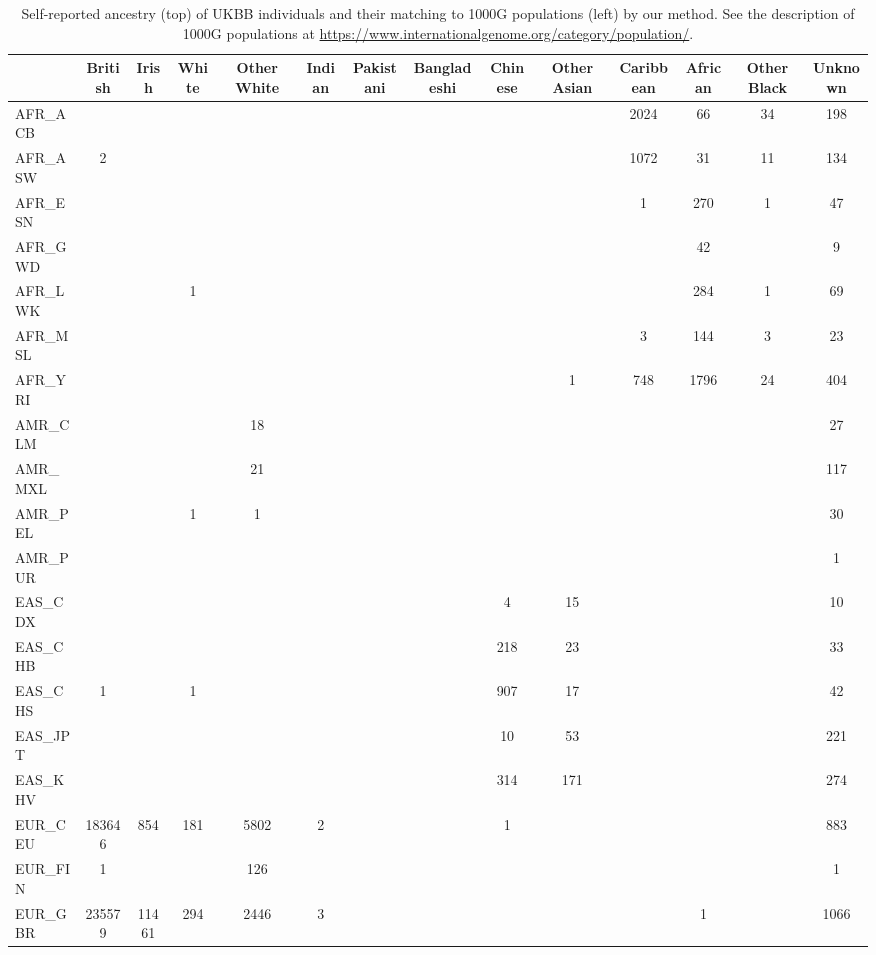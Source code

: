 \begin{table}[ht]
\centering
\caption{Self-reported ancestry (top) of UKBB individuals and their matching to 1000G populations (left) by our method. See the description of 1000G populations at \url{https://www.internationalgenome.org/category/population/}.} 
\label{tab:ancestry-fine-pred}
\begin{tabular}{|l|c|c|c|c|c|c|c|c|c|c|c|c|c|}
  \hline
 & British & Irish & White & Other White & Indian & Pakistani & Bangladeshi & Chinese & Other Asian & Caribbean & African & Other Black & Unknown \\ 
  \hline
AFR\_ACB &  &  &  &  &  &  &  &  &  & 2024 & 66 & 34 & 198 \\ 
  AFR\_ASW & 2 &  &  &  &  &  &  &  &  & 1072 & 31 & 11 & 134 \\ 
  AFR\_ESN &  &  &  &  &  &  &  &  &  & 1 & 270 & 1 & 47 \\ 
  AFR\_GWD &  &  &  &  &  &  &  &  &  &  & 42 &  & 9 \\ 
  AFR\_LWK &  &  & 1 &  &  &  &  &  &  &  & 284 & 1 & 69 \\ 
  AFR\_MSL &  &  &  &  &  &  &  &  &  & 3 & 144 & 3 & 23 \\ 
  AFR\_YRI &  &  &  &  &  &  &  &  & 1 & 748 & 1796 & 24 & 404 \\ 
   \hline
AMR\_CLM &  &  &  & 18 &  &  &  &  &  &  &  &  & 27 \\ 
  AMR\_MXL &  &  &  & 21 &  &  &  &  &  &  &  &  & 117 \\ 
  AMR\_PEL &  &  & 1 & 1 &  &  &  &  &  &  &  &  & 30 \\ 
  AMR\_PUR &  &  &  &  &  &  &  &  &  &  &  &  & 1 \\ 
   \hline
EAS\_CDX &  &  &  &  &  &  &  & 4 & 15 &  &  &  & 10 \\ 
  EAS\_CHB &  &  &  &  &  &  &  & 218 & 23 &  &  &  & 33 \\ 
  EAS\_CHS & 1 &  & 1 &  &  &  &  & 907 & 17 &  &  &  & 42 \\ 
  EAS\_JPT &  &  &  &  &  &  &  & 10 & 53 &  &  &  & 221 \\ 
  EAS\_KHV &  &  &  &  &  &  &  & 314 & 171 &  &  &  & 274 \\ 
   \hline
EUR\_CEU & 183646 & 854 & 181 & 5802 & 2 &  &  & 1 &  &  &  &  & 883 \\ 
  EUR\_FIN & 1 &  &  & 126 &  &  &  &  &  &  &  &  & 1 \\ 
  EUR\_GBR & 235579 & 11461 & 294 & 2446 & 3 &  &  &  &  &  & 1 &  & 1066 \\ 

\end{tabular}
\end{table}
